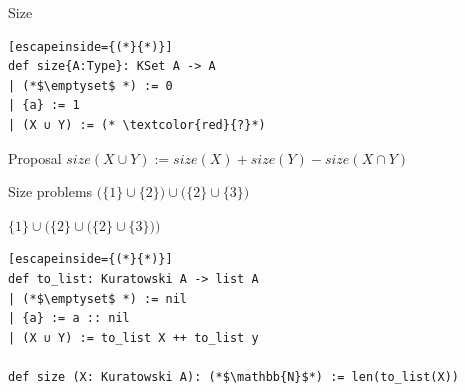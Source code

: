 \documentclass{beamer}
\begin{document}
\begin{frame}[fragile]{Size}
    \begin{lstlisting}[escapeinside={(*}{*)}]        
def size{A:Type}: KSet A -> A
| (*$\emptyset$ *) := 0
| {a} := 1
| (X ∪ Y) := (* \textcolor{red}{?}*)
    \end{lstlisting}
\pause
    \begin{block}{Proposal}
        $size(X \cup Y) := size(X) + size (Y) - size(X \cap Y)$
    \end{block}
\end{frame}

\begin{frame}[fragile]{Size problems}
    $\bigl( \{1\} \cup \{2\} \bigr) \cup \bigl( \{2\} \cup \{3\} \bigr) $



    $ \{1\} \cup \bigl( \{2\} \cup \bigl( \{2\} \cup \{3\} \bigr) \bigr) $
\pause
\begin{lstlisting}[escapeinside={(*}{*)}]
def to_list: Kuratowski A -> list A
| (*$\emptyset$ *) := nil
| {a} := a :: nil
| (X ∪ Y) := to_list X ++ to_list y

def size (X: Kuratowski A): (*$\mathbb{N}$*) := len(to_list(X))
\end{lstlisting}
\end{frame}
    
\end{document}
